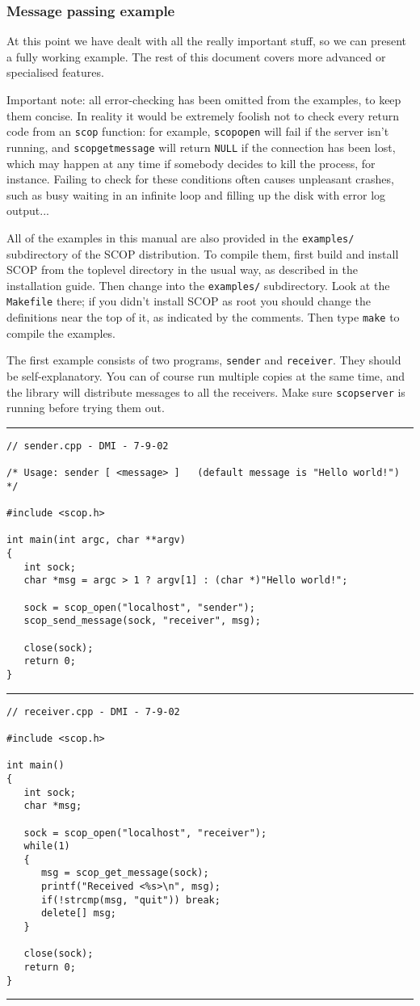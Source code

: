 \documentclass[12pt,a4paper,twoside]{article}
\renewcommand{\_}{\texttt{\symbol{95}}}
\newcommand{\codebar}{\rule{\textwidth}{0.3mm}}
\begin{document}
\subsubsection*{Message passing example}

At this point we have dealt with all the really important stuff, so
we can present a fully working example. The rest of this document
covers more advanced or specialised features.

Important note: all error-checking has been omitted from the examples,
to keep them concise. In reality it would be extremely foolish not to
check every return code from an \texttt{scop} function: for example,
\texttt{scop\_open} will fail if the server isn't running, and
\texttt{scop\_get\_message} will return \texttt{NULL} if the connection
has been lost, which may happen at any time if somebody decides to kill
the process, for instance. Failing to check for these conditions often
causes unpleasant crashes, such as busy waiting in an infinite loop and
filling up the disk with error log output...

All of the examples in this manual are also provided in the
\texttt{examples/} subdirectory of the SCOP distribution. To compile
them, first build and install SCOP from the toplevel directory in the
usual way, as described in the installation guide. Then change into the
\texttt{examples/} subdirectory. Look at the \texttt{Makefile} there;
if you didn't install SCOP as root you should change the definitions
near the top of it, as indicated by the comments. Then type
\texttt{make} to compile the examples.

The first example consists of two programs, \texttt{sender}
and \texttt{receiver}. They should be self-explanatory.
You can of course run multiple copies at the same time,
and the library will distribute messages to all the
receivers. Make sure \texttt{scopserver} is running before
trying them out.

\codebar
\small
\begin{verbatim}
// sender.cpp - DMI - 7-9-02

/* Usage: sender [ <message> ]   (default message is "Hello world!") */

#include <scop.h>

int main(int argc, char **argv)
{
   int sock;
   char *msg = argc > 1 ? argv[1] : (char *)"Hello world!";
   
   sock = scop_open("localhost", "sender");
   scop_send_message(sock, "receiver", msg);
   
   close(sock);
   return 0;
}
\end{verbatim}
\normalsize
\codebar
\small
\begin{verbatim}
// receiver.cpp - DMI - 7-9-02

#include <scop.h>

int main()
{
   int sock;
   char *msg;
   
   sock = scop_open("localhost", "receiver");
   while(1)
   {
      msg = scop_get_message(sock);
      printf("Received <%s>\n", msg);
      if(!strcmp(msg, "quit")) break;
      delete[] msg;
   }
   
   close(sock);
   return 0;
}
\end{verbatim}
\normalsize
\codebar
\end{document}
